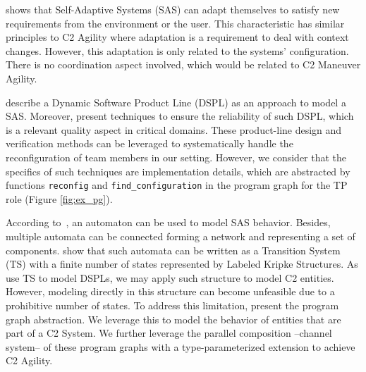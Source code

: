 \citet{SAS04} shows that Self-Adaptive Systems (SAS) can adapt themselves to satisfy new requirements from the environment or the user. This characteristic has \color{black}similar principles to C2 Agility \color{black}where adaptation is a requirement to deal with context changes. However, this adaptation is only related to the systems' configuration. There is no coordination aspect involved, which would be related to C2 Maneuver Agility.

\citet{Rosenmuller2011} describe a Dynamic Software Product Line (DSPL) as an approach to model a SAS.
Moreover, \citet{BSN-DSPL} present techniques to ensure the reliability of such DSPL, which is a relevant quality aspect in critical domains.
These product-line design and verification methods can be leveraged to systematically handle the reconfiguration of team members in our setting.
However, we consider that the specifics of such techniques are implementation details, which are abstracted by functions \texttt{reconfig} and \texttt{find\_configuration} in the program graph for the TP role (Figure \ref{fig:ex_pg}).


According to~\citet{Rutten2017}, an automaton can be used to model SAS behavior. Besides, multiple automata can be connected forming a network and representing a set of components. \citet{MC01} show that such automata can be written as a Transition System (TS) with a finite number of states represented by Labeled Kripke Structures. As \citet{ltl02} use TS to model DSPLs, we may apply such structure to model C2 entities. However, modeling directly in this structure can become unfeasible due to a \color{black}prohibitive number \color{black}of states. To address this limitation, \citet{MC01} present the program graph abstraction.   \color{black}We leverage this \color{black}to model the behavior of entities that are part of a C2 System. We further leverage the parallel composition --channel system-- of these program graphs with a type-parameterized extension to achieve C2 Agility. 



